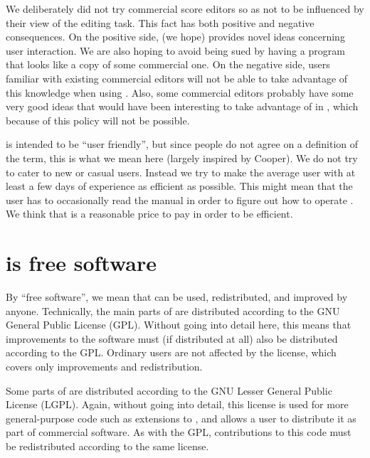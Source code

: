 We deliberately did not try commercial score editors so as not to be
influenced by their view of the editing task.  This fact has both
positive and negative consequences.  On the positive side, {\gs} (we
hope) provides novel ideas concerning user interaction.  We are also
hoping to avoid being sued by having a program that looks like a copy
of some commercial one.  On the negative side, users familiar with
existing commercial editors will not be able to take advantage of this
knowledge when using {\gs}.  Also, some commercial editors probably
have some very good ideas that would have been interesting to take
advantage of in {\gs}, which because of this policy will not be
possible. 

{\gs} is intended to be ``user friendly'', but since people do not
agree on a definition of the term, this is what we mean here (largely
inspired by Cooper).  We do not try to cater to new or casual users.
Instead we try to make the average user with at least a few days of
experience as efficient as possible.  This might mean that the user
has to occasionally read the manual in order to figure out how to
operate {\gs}.  We think that is a reasonable price to pay in order to
be efficient. 
\section{{\gs} is free software}

By ``free software'', we mean that {\gs} can be used, redistributed,
and improved by anyone.  Technically, the main parts of {\gs} are
distributed according to the GNU General Public License (GPL).
Without going into detail here, this means that improvements to the
software must (if distributed at all) also be distributed according to
the GPL.  Ordinary users are not affected by the license, which covers
only improvements and redistribution.  

Some parts of {\gs} are distributed according to the GNU Lesser
General Public License (LGPL).  Again, without going into detail, this
license is used for more general-purpose code such as extensions to
{\clim}, and allows a user to distribute it as part of commercial
software.  As with the GPL, contributions to this code must be
redistributed according to the same license. 


